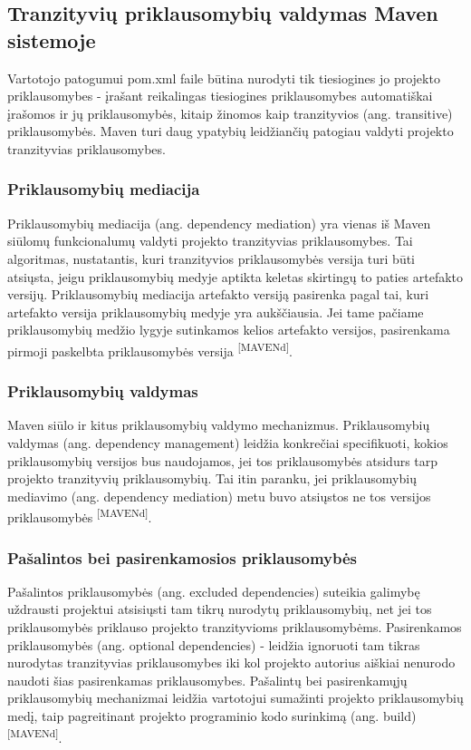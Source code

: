 \subsection{Tranzityvių priklausomybių valdymas Maven sistemoje}

Vartotojo patogumui pom.xml faile būtina nurodyti tik tiesiogines jo projekto priklausomybes -
įrašant reikalingas tiesiogines priklausomybes automatiškai įrašomos ir jų priklausomybės, kitaip žinomos
kaip tranzityvios (ang. transitive) priklausomybės. Maven turi daug ypatybių leidžiančių patogiau valdyti
projekto tranzityvias priklausomybes.

\subsubsection{Priklausomybių mediacija}
Priklausomybių mediacija (ang. dependency mediation) yra vienas iš Maven siūlomų
funkcionalumų valdyti projekto tranzityvias priklausomybes. Tai algoritmas, nustatantis, kuri
tranzityvios priklausomybės versija turi būti atsiųsta, jeigu priklausomybių medyje aptikta keletas skirtingų
to paties artefakto versijų. Priklausomybių mediacija artefakto versiją pasirenka pagal tai, kuri artefakto
versija priklausomybių medyje yra aukščiausia. Jei tame pačiame priklausomybių medžio lygyje sutinkamos kelios
artefakto versijos, pasirenkama pirmoji paskelbta priklausomybės versija \textsuperscript{[MAVENd]}.

\subsubsection{Priklausomybių valdymas}
Maven siūlo ir kitus priklausomybių valdymo mechanizmus. Priklausomybių valdymas (ang. dependency management)
leidžia konkrečiai specifikuoti, kokios priklausomybių versijos bus naudojamos, jei
tos priklausomybės atsidurs tarp projekto tranzityvių priklausomybių. Tai itin paranku, jei priklausomybių
mediavimo (ang. dependency mediation) metu buvo atsiųstos ne tos versijos priklausomybės \textsuperscript{[MAVENd]}.

\subsubsection{Pašalintos bei pasirenkamosios priklausomybės}
Pašalintos priklausomybės (ang. excluded dependencies) suteikia galimybę uždrausti
projektui atsisiųsti tam tikrų nurodytų priklausomybių, net jei tos priklausomybės
priklauso projekto tranzityvioms priklausomybėms. Pasirenkamos priklausomybės (ang. optional dependencies) - leidžia
ignoruoti tam tikras nurodytas tranzityvias priklausomybes iki kol projekto autorius aiškiai nenurodo naudoti
šias pasirenkamas priklausomybes. Pašalintų bei pasirenkamųjų priklausomybių mechanizmai leidžia
vartotojui sumažinti projekto priklausomybių medį, taip pagreitinant projekto programinio kodo surinkimą (ang. build) \textsuperscript{[MAVENd]}.